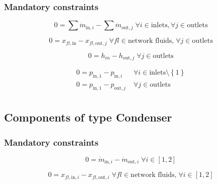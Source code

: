 \documentclass[]{article}
\begin{document}
\subsubsection{Mandatory constraints}

\begin{equation}
\label{eq:Splitter_mass_flow_constraints}
0 =\sum\dot{m}_{\mathrm{in},i}-\sum\dot{m}_{\mathrm{out},j}\;\forall i \in \text{inlets}, \forall j \in \text{outlets}
\end{equation}

\begin{equation}
\label{eq:Splitter_fluid_constraints}
0 = x_{fl\mathrm{,in}} - x_{fl\mathrm{,out,}j}\; \forall fl \in \text{network fluids,} \; \forall j \in\text{outlets}
\end{equation}

\begin{equation}
\label{eq:Splitter_energy_balance_constraints}
0=h_{in}-h_{\mathrm{out,}j}\;\forall j \in\text{outlets}
\end{equation}

\begin{equation}
\label{eq:Splitter_pressure_constraints}
\begin{split}
0 = p_\mathrm{in,1} - p_{\mathrm{in,}i} & \; \forall i \in \text{inlets} \setminus \left\lbrace 1\right\rbrace\\
0 = p_\mathrm{in,1} - p_{\mathrm{out,}j} & \; \forall j \in \text{outlets}\\
\end{split}
\end{equation}


\subsection{Components of type Condenser}

\subsubsection{Mandatory constraints}

\begin{equation}
\label{eq:Condenser_mass_flow_constraints}
0=\dot{m}_{\mathrm{in,}i}-\dot{m}_{\mathrm{out,}i}\; \forall i \in [1, 2]
\end{equation}

\begin{equation}
\label{eq:Condenser_fluid_constraints}
0=x_{fl\mathrm{,in,}i}-x_{fl\mathrm{,out,}i}\;\forall fl \in\text{network fluids,}\; \forall i \in [1, 2]
\end{equation}
\end{document}
